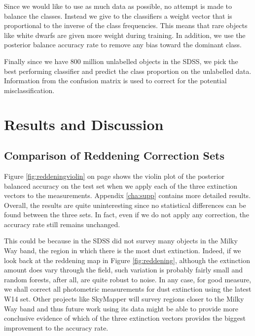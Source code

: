 Since we would like to use as much data as possible, no attempt is made to balance the classes.
Instead we give to the classifiers a weight vector that is proportional to the inverse
of the class frequencies. This means that rare objects like white dwarfs are given more
weight during training. In addition, we use the posterior balance accuracy rate to remove
any bias toward the dominant class.

Finally since we have 800 million unlabelled objects in the SDSS, we pick the best performing
classifier and predict the class proportion on the unlabelled data. Information from the confusion
matrix is used to correct for the potential misclassification.

\section{Results and Discussion}
\label{sec:results1}

\subsection{Comparison of Reddening Correction Sets}
\label{sub:extinction}

Figure \ref{fig:reddeningviolin} on page \pageref{fig:reddeningviolin} shows the violin plot of the
posterior balanced accuracy on the test set when we apply each of the three extinction vectors to
the measurements. Appendix \ref{cha:supp} contains more detailed results. Overall, the results are
quite uninteresting since no statistical differences can be found between the three sets. In fact,
even if we do not apply any correction, the accuracy rate still remains unchanged.

This could be because in the SDSS did not survey many objects in the Milky Way band, the region in
which there is the most dust extinction. Indeed, if we look back at the reddening map in Figure
\ref{fig:reddening}, although the extinction amount does vary through the field, such variation is
probably fairly small and random forests, after all, are quite robust to noise. In any case, for
good measure, we shall correct all photometric measurements for dust extinction using the latest
W14 set. Other projects like SkyMapper will survey regions closer to the Milky Way band and thus
future work using its data might be able to provide more conclusive evidence of which of the three
extinction vectors provides the biggest improvement to the accuracy rate.

